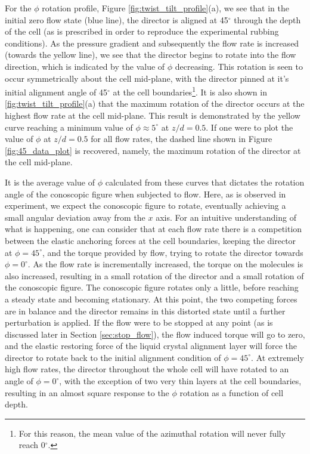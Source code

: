 For the $\phi$ rotation profile, Figure \ref{fig:twist_tilt_profile}(a), we see that in the initial zero flow state (blue line), the director is aligned at 45$^{\circ}$ through the depth of the cell (as is prescribed in order to reproduce the experimental rubbing conditions). As the pressure gradient and subsequently the flow rate is increased (towards the yellow line), we see that the director begins to rotate into the flow direction, which is indicated by the value of $\phi$ decreasing. This rotation is seen to occur symmetrically about the cell mid-plane, with the director pinned at it's initial alignment angle of 45$^{\circ}$ at the cell boundaries\footnote{For this reason, the mean value of the azimuthal rotation will never fully reach 0$^{\circ}$.}. It is also shown in \ref{fig:twist_tilt_profile}(a) that the maximum rotation of the director occurs at the highest flow rate at the cell mid-plane. This result is demonstrated by the yellow curve reaching a minimum value of $\phi\approx5^{\circ}$ at $z/d=0.5$. If one were to plot the value of $\phi$ at $z/d=0.5$ for all flow rates, the dashed line shown in Figure \ref{fig:45_data_plot} is recovered, namely, the maximum rotation of the director at the cell mid-plane. 

It is the average value of $\phi$ calculated from these curves that dictates the rotation angle of the conoscopic figure when subjected to flow. Here, as is observed in experiment, we expect the conoscopic figure to rotate, eventually achieving a small angular deviation away from the $x$ axis. For an intuitive understanding of what is happening, one can consider that at each flow rate there is a competition between the elastic anchoring forces at the cell boundaries, keeping the director at $\phi=45^{\circ}$, and the torque provided by flow, trying to rotate the director towards $\phi=0^{\circ}$. As the flow rate is incrementally increased, the torque on the molecules is also increased, resulting in a small rotation of the director and a small rotation of the conoscopic figure. The conoscopic figure rotates only a little, before reaching a steady state and becoming stationary. At this point, the two competing forces are in balance and the director remains in this distorted state until a further perturbation is applied. If the flow were to be stopped at any point (as is discussed later in Section \ref{sec:stop_flow}), the flow induced torque will go to zero, and the elastic restoring force of the liquid crystal alignment layer will force the director to rotate back to the initial alignment condition of $\phi=45^{\circ}$. At extremely high flow rates, the director throughout the whole cell will have rotated to an angle of $\phi=0^{\circ}$, with the exception of two very thin layers at the cell boundaries, resulting in an almost square response to the $\phi$ rotation as a function of cell depth.

